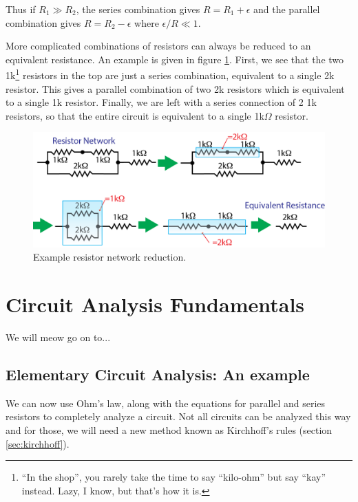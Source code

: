 \documentclass{tufte-book}
\begin{document}
\noindent Thus if $R_1\gg R_2$, the series combination gives $R = R_1 + \epsilon$ and the parallel combination gives $R = R_2-\epsilon$ where $\epsilon/R\ll1$.

More complicated combinations of resistors can always be reduced to an equivalent resistance. An example is given in figure \ref{fig:ex_resnet}. First, we see that the two 1k\footnote{``In the shop'', you rarely take the time to say ``kilo-ohm'' but say ``kay'' instead. Lazy, I know, but that's how it is.} resistors in the top are just a series combination, equivalent to a single 2k resistor. This gives a parallel combination of two 2k resistors which is equivalent to a single 1k resistor. Finally, we are left with a series connection of 2 1k resistors, so that the entire circuit is equivalent to a single 1k$\Omega$ resistor.

\begin{figure}[h]
\caption{Example resistor network reduction.}
\label{fig:ex_resnet}
\begin{center}
\includegraphics[width=\textwidth]{ex_resnet.png}
\end{center}
\end{figure}




\chapter{Circuit Analysis Fundamentals}
We will meow go on to...

\section{Elementary Circuit Analysis: An example}
\label{sec:circuitanalysis}
We can now use Ohm's law, along with the equations for parallel and series resistors to completely analyze a circuit. Not all circuits can be analyzed this way and for those, we will need a new method known as Kirchhoff's rules (section \ref{sec:kirchhoff}). 
\end{document}

